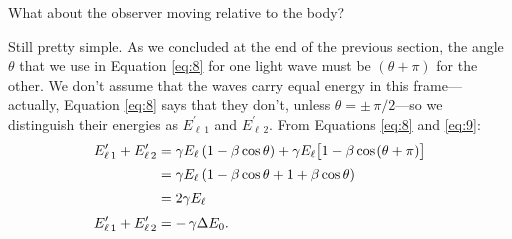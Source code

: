 \documentclass[12pt]{article}
\begin{document}
What about the observer moving relative to the body?

Still pretty simple. As we concluded at the end of the previous section, the angle $\theta$ that we use in Equation \ref{eq:8} for one light wave must be $(\theta + \pi)$ for the other. We don't assume that the waves carry equal energy in this frame---actually, Equation \ref{eq:8} says that they don't, unless $\theta = \pm \, \pi / 2$---so we distinguish their energies as $E_{\ell \, 1}^{\prime}$ and $E_{\ell \, 2}^{\prime}$. From Equations \ref{eq:8} and \ref{eq:9}:
\begin{equation}\label{eq:10}
\begin{split}
E_{\ell \, 1}^{\prime} + E_{\ell \, 2}^{\prime} &= \gamma E_{\ell} \left(1-\beta\cos\theta \right) + \gamma E_{\ell} \big[ 1 - \beta \cos \mkern1.5mu ( \theta + \pi ) \big] \\[2pt]
&= \gamma E_{\ell} \left(1 - \beta\cos\theta + 1 + \beta\cos\theta \right) \\[2pt]
&= 2 \gamma E_{\ell} \\[3pt]
E_{\ell \, 1}^{\prime} + E_{\ell \, 2}^{\prime} &= - \, \gamma \Delta E_0.
\end{split}
\end{equation}
\end{document}
